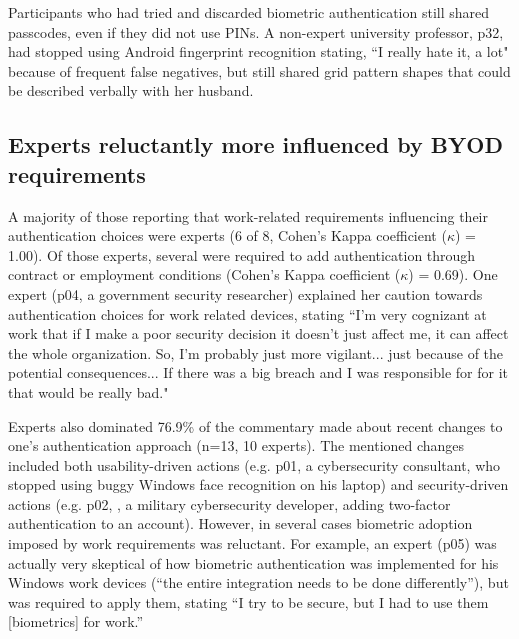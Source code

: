 Participants who had tried and discarded biometric authentication still shared
passcodes, even if they did not use PINs. A non-expert university professor,
p32, had stopped using Android fingerprint recognition stating, ``I really hate
it, a lot" because of frequent false negatives, but still shared grid pattern
shapes that could be described verbally with her
husband. %

\subsection{Experts reluctantly more influenced by BYOD requirements}
A majority of those reporting that work-related requirements influencing their
authentication choices were experts (6 of 8, Cohen's Kappa coefficient
(\(\kappa\)) = 1.00). %
Of those experts, several were required to add authentication
through contract or employment conditions (Cohen's Kappa coefficient
(\(\kappa\)) = 0.69). One expert (p04, a government security researcher)
explained her caution towards authentication choices for work related devices,
stating ``I'm very cognizant at work that if I make a poor security decision it
doesn't just affect me, it can affect the whole organization. So, I'm probably
just more vigilant... just because of the potential consequences... If there was
a big breach and I was responsible for for it that would be really bad."

Experts also dominated 76.9\% of the commentary made about recent changes to
one's authentication approach (n=13, 10 experts). The mentioned changes included
both usability-driven actions (e.g. p01, a cybersecurity consultant, who stopped
using buggy Windows face recognition on his laptop) and security-driven actions
(e.g. p02, , a military cybersecurity developer, adding two-factor
authentication to an account). However, in several cases biometric adoption
imposed by work requirements was reluctant. For example, an expert (p05) was
actually very skeptical of how biometric authentication was implemented for his
Windows work devices (``the entire integration needs to be done differently''),
but was required to apply them, stating ``I try to be secure, but I had to use
them [biometrics] for work.''

